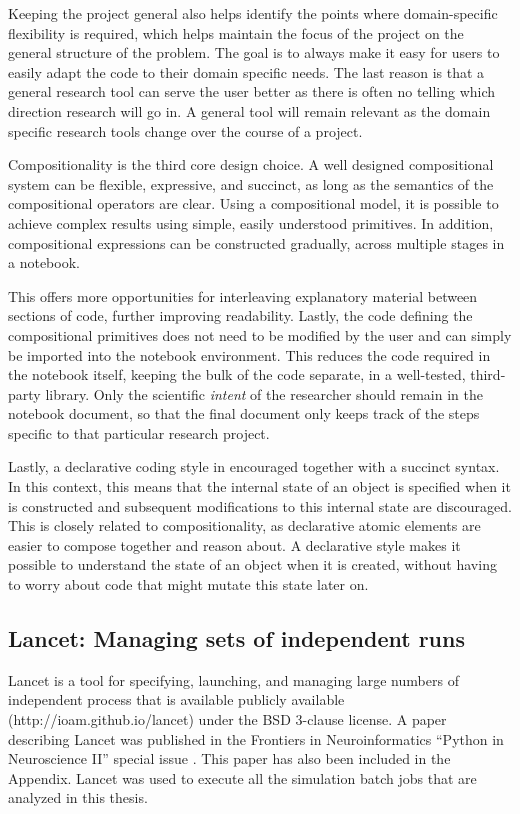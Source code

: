 \documentclass[phd,ianc,twoside]{infthesis}
\begin{document}
Keeping the project general also helps identify the points where
domain-specific flexibility is required, which helps maintain the focus
of the project on the general structure of the problem. The goal is to
always make it easy for users to easily adapt the code to their domain
specific needs. The last reason is that a general research tool can
serve the user better as there is often no telling which direction
research will go in. A general tool will remain relevant as the domain
specific research tools change over the course of a project.

Compositionality is the third core design choice. A well designed
compositional system can be flexible, expressive, and succinct, as long
as the semantics of the compositional operators are clear. Using a
compositional model, it is possible to achieve complex results using
simple, easily understood primitives. In addition, compositional
expressions can be constructed gradually, across multiple stages in a
notebook.

This offers more opportunities for interleaving explanatory material
between sections of code, further improving readability. Lastly, the
code defining the compositional primitives does not need to be modified
by the user and can simply be imported into the notebook
environment. This reduces the code required in the notebook itself,
keeping the bulk of the code separate, in a well-tested, third-party
library. Only the scientific \emph{intent} of the researcher should
remain in the notebook document, so that the final document only keeps
track of the steps specific to that particular research project.

Lastly, a declarative coding style in encouraged together with a
succinct syntax. In this context, this means that the internal state of
an object is specified when it is constructed and subsequent
modifications to this internal state are discouraged. This is closely
related to compositionality, as declarative atomic elements are easier
to compose together and reason about.  A declarative style makes it
possible to understand the state of an object when it is created,
without having to worry about code that might mutate this state later
on.


\subsection{Lancet: Managing sets of independent runs}

Lancet is a tool for specifying, launching, and managing large numbers
of independent process that is available publicly available
(\textsf{http://ioam.github.io/lancet}) under the BSD 3-clause
license. A paper describing Lancet was published in the Frontiers in
Neuroinformatics ``Python in Neuroscience II'' special issue
\citep{stevens_fninf13}. This paper has also been included in the
Appendix. Lancet was used to execute all the simulation batch jobs that
are analyzed in this thesis.
\end{document}
